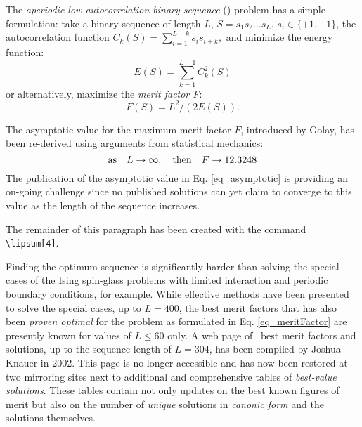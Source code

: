 The {\em aperiodic low-autocorrelation binary sequence} (\labs) problem 
has a simple formulation: take a binary sequence of length $L$,  
$S = s_1 s_2 \ldots s_L$, $s_i \in \{ +1,-1 \}$, the autocorrelation function
$C_k(S) = \sum_{i=1}^{L-k}s_{i}s_{i+k},$ and minimize the energy function:
\begin{equation}
E(S) =  \sum_{k=1}^{L-1}C_{k}^{2}(S)
\label{eq_energy}
\end{equation}
or alternatively, maximize the 
{\em merit factor F}\cite[-1ex]{Lib-OPUS-labs-1977-IEEE_TIT-Golay,
Lib-OPUS-labs-1982-IEEE_TIT-Golay,
Lib-OPUS-labs-1990-IEEE_TIT-Golay-skewsym}:
\begin{equation}
F(S) =  {L^2}/({2E(S)}).
\label{eq_meritFactor}
\end{equation}
 

The asymptotic value for the maximum merit factor $F$, introduced
by Golay, has been re-derived
using arguments from statistical mechanics\cite[2ex]{Lib-OPUS-labs-1987-JourPhys-Bernasconi}:
\begin{equation}
{\rm as~~~} L \rightarrow \infty {\rm ,~~~then~~~}F  \rightarrow 12.3248
\label{eq_asymptotic}
\end{equation} 
The publication of the asymptotic value in Eq. \ref{eq_asymptotic}
is providing an on-going challenge since no published solutions can yet claim to converge to this value
as the length of the sequence increases. 

The remainder of this paragraph has been created with the command \verb+\lipsum[4]+.
\lipsum[4]


Finding the optimum sequence is significantly harder than solving the special cases of the Ising spin-glass problems with limited interaction and periodic boundary conditions, for 
example\cite{Lib-OPUS-labs-2003-GECCO-Goldberg-periodic}. 
While effective methods have been presented to solve the special 
cases\cite[3ex]{Lib-OPUS-labs-2003-GECCO-Goldberg-periodic}, up to $L = 400$, 
the best merit factors that has also been {\em proven optimal} for the problem as formulated in Eq. \ref{eq_meritFactor}
are presently known for values of $L \le 60$ 
only\cite[3ex]{Lib-OPUS-labs-1996-JPhysA-Mertens-BB_solutions}.
A web page of \labs\ best merit factors and solutions, 
up to the sequence length of $L=304$, has been compiled by Joshua Knauer in 2002.
This page is no longer accessible and has now been restored 
at two mirroring sites\cite[3ex]{Lib-OPUS2-labs-2014-homepage-Knauer} next to 
additional and  comprehensive tables of {\em best-value solutions}.
These tables contain not only updates on the best known figures of merit but also 
on the number of {\em unique}  solutions in {\em canonic form} and the solutions themselves.
%

